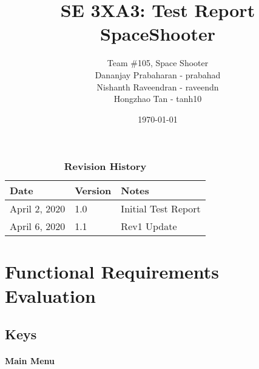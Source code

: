 \documentclass[12pt, titlepage]{article}
\title{SE 3XA3: Test Report\\SpaceShooter}
\author{Team \#105, Space Shooter
		\\ Dananjay Prabaharan - prabahad
		\\ Nishanth Raveendran - raveendn
		\\ Hongzhao Tan - tanh10
}
\date{\today}
\begin{document}
\maketitle

\tableofcontents
\listoftables
\listoffigures

\begin{table}[bp]
\caption{\bf Revision History}
\begin{tabularx}{\textwidth}{p{3cm}p{2cm}X}
\toprule {\bf Date} & {\bf Version} & {\bf Notes}\\
\midrule
April 2, 2020 & 1.0 & Initial Test Report\\
April 6, 2020 & 1.1 & Rev1 Update\\
\bottomrule
\end{tabularx}
\end{table}
\FloatBarrier
\newpage



\section{Functional Requirements Evaluation}

\subsection{Keys}

\paragraph{Main Menu}
\end{document}
